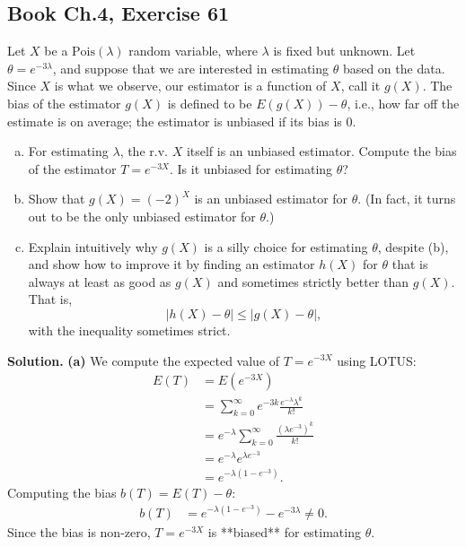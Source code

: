 \documentclass[11pt,a4paper]{article}
\begin{document}
\subsection{Book Ch.4, Exercise 61}
\begin{tcolorbox}[title={Book Ch.4, Exercise 61}]
Let $X$ be a $\text{Pois}(\lambda)$ random variable, where $\lambda$ is fixed but unknown. Let $\theta = e^{-3\lambda}$, and suppose that we are interested in estimating $\theta$ based on the data. Since $X$ is what we observe, our estimator is a function of $X$, call it $g(X)$. The bias of the estimator $g(X)$ is defined to be $E(g(X)) - \theta$, i.e., how far off the estimate is on average; the estimator is unbiased if its bias is 0.
\begin{enumerate}[(a)]
\item For estimating $\lambda$, the r.v. $X$ itself is an unbiased estimator. Compute the bias of the estimator $T = e^{-3X}$. Is it unbiased for estimating $\theta$?
\item Show that $g(X) = (-2)^X$ is an unbiased estimator for $\theta$. (In fact, it turns out to be the only unbiased estimator for $\theta$.)
\item Explain intuitively why $g(X)$ is a silly choice for estimating $\theta$, despite (b), and show how to improve it by finding an estimator $h(X)$ for $\theta$ that is always at least as good as $g(X)$ and sometimes strictly better than $g(X)$. That is,
\[
|h(X) - \theta| \le |g(X) - \theta|,
\]
with the inequality sometimes strict.
\end{enumerate}
\end{tcolorbox}

\noindent \textbf{Solution.} \textbf{(a)} We compute the expected value of $T = e^{-3X}$ using LOTUS:
\begin{align*}
E(T) &= E\left(e^{-3X}\right) \\
&= \sum_{k=0}^{\infty} e^{-3k} \frac{e^{-\lambda} \lambda^k}{k!} \\
&= e^{-\lambda} \sum_{k=0}^{\infty} \frac{\left(\lambda e^{-3}\right)^k}{k!} \\
&= e^{-\lambda} e^{\lambda e^{-3}} \\
&= e^{-\lambda\left(1 - e^{-3}\right)}.
\end{align*}
Computing the bias $b(T) = E(T) - \theta$:
\begin{align*}
b(T) &= e^{-\lambda\left(1 - e^{-3}\right)} - e^{-3\lambda} \neq 0.
\end{align*}
Since the bias is non-zero, $T = e^{-3X}$ is **biased** for estimating $\theta$.
\end{document}
